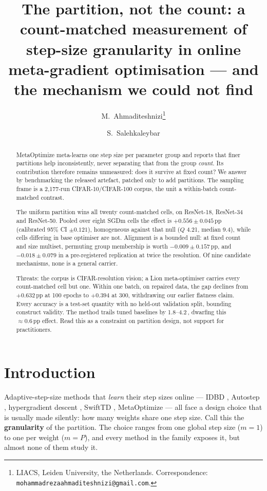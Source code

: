 \documentclass[10pt,letterpaper]{article}
\title{The partition, not the count: a count-matched measurement of step-size
granularity in online meta-gradient optimisation --- and the mechanism we could not find}
\author{%
  M.\ Ahmaditeshnizi\thanks{LIACS, Leiden University, the Netherlands.
  Correspondence: \texttt{mohammadrezaahmaditeshnizi@gmail.com}.}
  \and S.\ Salehkaleybar\footnotemark[1]%
}
\date{}
\newcommand{\pp}{\,\text{pp}}                  %
\begin{document}
\maketitle

\begin{abstract}
MetaOptimize \citep{sharifnassab2025metaoptimize} meta-learns one step size per parameter group and
reports that finer partitions help inconsistently, never separating that from the group
\emph{count}. Its contribution therefore remains unmeasured: does it survive at fixed count?
We answer by benchmarking the released artefact, patched only to add partitions. The sampling
frame is a 2{,}177-run CIFAR-10/CIFAR-100 corpus, the unit a within-batch count-matched contrast.

The uniform partition wins all twenty count-matched cells, on ResNet-18, ResNet-34 and
ResNet-50. Pooled over eight SGDm cells the effect is $+0.556 \pm 0.045\pp$ (calibrated 95\% CI $\pm 0.121$), homogeneous against that null ($Q$ 4.21, median 9.4), while
cells differing in base optimiser are not. Alignment
is a bounded null: at fixed count and size multiset, permuting group membership is worth
$-0.009 \pm 0.157\pp$, and $-0.018 \pm 0.079$ in a pre-registered replication at twice the
resolution. Of nine candidate mechanisms, none is a general carrier.

Threats: the corpus is CIFAR-resolution vision; a Lion meta-optimiser carries every
count-matched cell but one. Within one batch, on repaired data, the gap declines from
$+0.632\pp$ at 100 epochs to $+0.394$ at 300, withdrawing our earlier flatness claim. Every
accuracy is a test-set quantity with no held-out validation split, bounding construct validity.
The method trails tuned baselines by 1.8--4.2\pp, dwarfing this ${\approx}0.6\pp$ effect. Read
this as a constraint on partition design, not support for practitioners.
\end{abstract}

\section{Introduction}
\label{sec:intro}

Adaptive-step-size methods that \emph{learn} their step sizes online --- IDBD
\citep{sutton1992idbd}, Autostep \citep{mahmood2012autostep}, hypergradient descent
\citep{baydin2018hypergradient}, SwiftTD \citep{javed2024swifttd}, MetaOptimize
\citep{sharifnassab2025metaoptimize} --- all face a design choice that is usually made
silently: how many weights share one step size. Call this the \textbf{granularity} of the
partition. The choice ranges from one global step size ($m = 1$) to one per weight ($m = P$),
and every method in the family exposes it, but almost none of them study it.
\end{document}
